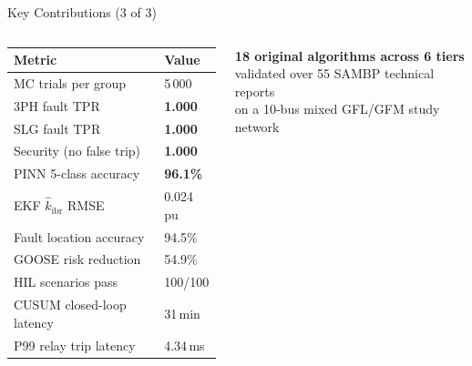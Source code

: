 \documentclass[aspectratio=169, 10pt]{beamer}
\newcommand{\kibr}{k_{\mathrm{ibr}}}
\begin{document}
\begin{frame}{Key Contributions (3 of 3)}
\begin{columns}[T]
      \vspace{0.2cm}
      \begin{tcolorbox}[result, title=Validation Metrics Summary]
        \scriptsize
        \begin{tabular}{@{}ll@{}}
          \toprule
          \textbf{Metric} & \textbf{Value} \\
          \midrule
          MC trials per group        & 5\,000 \\
          3PH fault TPR              & \textbf{1.000} \\
          SLG fault TPR              & \textbf{1.000} \\
          Security (no false trip)   & \textbf{1.000} \\
          PINN 5-class accuracy      & \textbf{96.1\%} \\
          EKF $\hat\kibr$ RMSE       & 0.024\,pu \\
          Fault location accuracy    & 94.5\% \\
          GOOSE risk reduction       & 54.9\% \\
          HIL scenarios pass         & 100/100 \\
          CUSUM closed-loop latency  & 31\,min \\
          P99 relay trip latency     & 4.34\,ms \\
          \bottomrule
        \end{tabular}
      \end{tcolorbox}
      \vspace{0.25cm}
      \begin{tcolorbox}[alert2]
        \scriptsize\centering
        \textbf{18 original algorithms across 6 tiers}\\
        validated over 55 SAMBP technical reports\\
        on a 10-bus mixed GFL/GFM study network
      \end{tcolorbox}
  \end{columns}


\end{frame}
\end{document}

